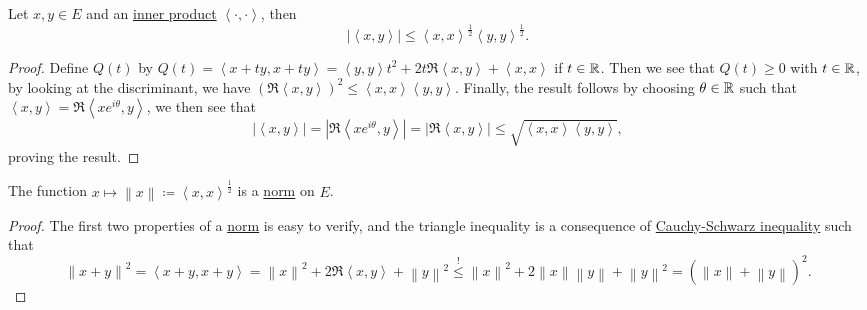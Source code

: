 \begin{theorem}\label{thm:Cauchy-Schwarz-ineq}
	Let \(x, y\in E\) and an \hyperref[def:inner-product]{inner product} \(\left\langle \cdot, \cdot \right\rangle \), then
	\[
		\left\vert \left\langle x, y \right\rangle  \right\vert \leq \left\langle x, x \right\rangle ^{\frac{1}{2}}\left\langle y, y \right\rangle ^{\frac{1}{2}}.
	\]
\end{theorem}
\begin{proof}
	Define \(Q(t)\) by \(Q(t) = \left\langle x+ty, x+ty \right\rangle = \left\langle y, y \right\rangle t^{2} + 2t \Re\left\langle x, y \right\rangle + \left\langle x,x \right\rangle\) if \(t\in \mathbb{\MakeUppercase{r}} \). Then we see that \(Q(t) \geq 0\) with \(t\in \mathbb{\MakeUppercase{r}} \), by looking at the discriminant, we have \((\Re\left\langle x, y \right\rangle) ^{2} \leq \left\langle x, x \right\rangle \left\langle y, y \right\rangle\). Finally, the result follows by choosing \(\theta \in \mathbb{\MakeUppercase{r}} \) such that \(\left\langle x, y \right\rangle = \Re\left\langle x e^{i\theta}, y \right\rangle\), we then see that
	\[
		\left\vert \left\langle x, y \right\rangle  \right\vert = \left\vert \Re \left\langle x e^{i \theta }, y \right\rangle  \right\vert = \left\vert \Re \left\langle x, y \right\rangle  \right\vert \leq \sqrt{\left\langle x, x \right\rangle \left\langle y, y \right\rangle },
	\]
	proving the result.
\end{proof}

\begin{corollary}\label{col:lec3}
	The function \(x\mapsto \left\lVert x\right\rVert \coloneqq \left\langle x, x \right\rangle ^{\frac{1}{2}}\) is a \hyperref[def:norm]{norm} on \(E\).
\end{corollary}
\begin{proof}
	The first two properties of a \hyperref[def:norm]{norm} is easy to verify, and the triangle inequality is a consequence of \hyperref[thm:Cauchy-Schwarz-ineq]{Cauchy-Schwarz inequality}  such that
	\[
		\left\lVert x+y\right\rVert ^{2} = \left\langle x+y, x+y \right\rangle = \left\lVert x\right\rVert ^{2} + 2\Re\left\langle x, y \right\rangle + \left\lVert y\right\rVert ^{2} \overset{\hyperref[thm:Cauchy-Schwarz-ineq]{\text{!}}}{\leq} \left\lVert x\right\rVert ^{2} + 2\left\lVert x\right\rVert \left\lVert y\right\rVert + \left\lVert y\right\rVert ^{2} = (\left\lVert x\right\rVert + \left\lVert y\right\rVert) ^{2} .
	\]
\end{proof}

